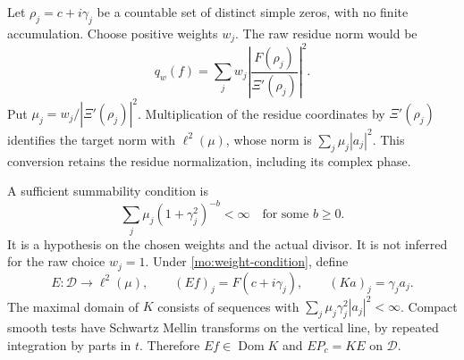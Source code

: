 Let $\rho_j=c+i\gamma_j$ be a countable set of distinct simple
zeros, with no finite accumulation. Choose positive weights $w_j$.
The raw residue norm would be
\begin{equation}
 q_w(f)=\sum_j w_j
       \left|\frac{F(\rho_j)}{\Xi'(\rho_j)}\right|^2.
 \label{mo:weighted-residue-norm}
\end{equation}
Put $\mu_j=w_j/|\Xi'(\rho_j)|^2$. Multiplication of the residue
coordinates by $\Xi'(\rho_j)$ identifies the target norm with
$\ell^2(\mu)$, whose norm is $\sum_j\mu_j|a_j|^2$.
This conversion retains the residue normalization, including its
complex phase.

A sufficient summability condition is
\begin{equation}
 \sum_j\mu_j(1+\gamma_j^2)^{-b}<\infty
 \quad\text{for some }b\geq0.
 \label{mo:weight-condition}
\end{equation}
It is a hypothesis on the chosen weights and the actual divisor.
It is not inferred for the raw choice $w_j=1$. Under
\eqref{mo:weight-condition}, define
\[
 E:\mathscr D\longrightarrow\ell^2(\mu),\qquad
 (Ef)_j=F(c+i\gamma_j),\qquad
 (Ka)_j=\gamma_ja_j.
\]
The maximal domain of $K$ consists of sequences with
$\sum_j\mu_j\gamma_j^2|a_j|^2<\infty$. Compact smooth tests have
Schwartz Mellin transforms on the vertical line, by repeated
integration by parts in $t$. Therefore $Ef\in\operatorname{Dom}K$
and $EP_c=KE$ on $\mathscr D$.

